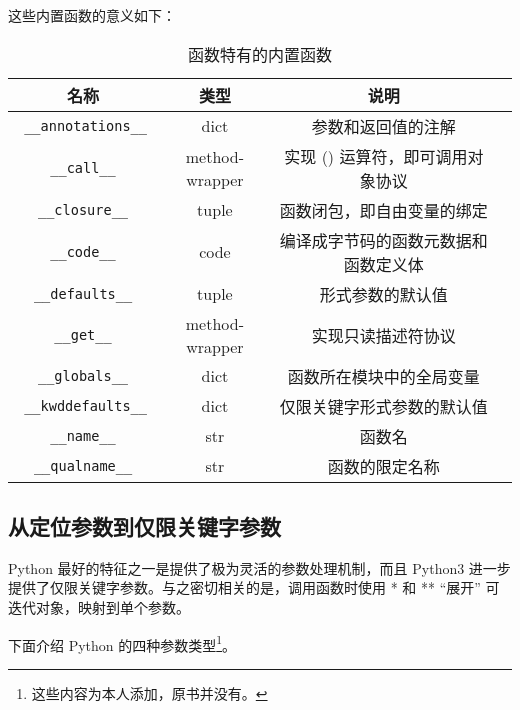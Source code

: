 

这些内置函数的意义如下：
\begin{table}[H]
    \centering
    \caption{函数特有的内置函数}
    \label{table:函数特有的内置函数}
    \setlength{\tabcolsep}{4mm}
    \begin{tabular}{c|c|cc}
        \toprule
        \textbf{名称} & \textbf{类型} & \textbf{说明} \\
        \midrule
        \texttt{ \_\_annotations\_\_ } & dict & 参数和返回值的注解 \\
        \texttt{ \_\_call\_\_ } & method-wrapper & 实现 () 运算符，即可调用对象协议 \\
        \texttt{ \_\_closure\_\_ } & tuple & 函数闭包，即自由变量的绑定 \\
        \texttt{ \_\_code\_\_ } & code & 编译成字节码的函数元数据和函数定义体 \\
        \texttt{ \_\_defaults\_\_ } & tuple & 形式参数的默认值 \\
        \texttt{ \_\_get\_\_ } & method-wrapper & 实现只读描述符协议 \\
        \texttt{ \_\_globals\_\_ } & dict & 函数所在模块中的全局变量 \\
        \texttt{ \_\_kwddefaults\_\_ } & dict & 仅限关键字形式参数的默认值 \\
        \texttt{ \_\_name\_\_ } & str & 函数名 \\
        \texttt{ \_\_qualname\_\_ } & str & 函数的限定名称 \\
        \bottomrule
    \end{tabular}
\end{table}

\subsection{从定位参数到仅限关键字参数}

Python 最好的特征之一是提供了极为灵活的参数处理机制，而且 Python3 进一步提供了仅限关键字参数。与之密切相关的是，调用函数时使用 * 和 ** ``展开'' 可迭代对象，映射到单个参数。

下面介绍 Python 的四种参数类型\footnote{这些内容为本人添加，原书并没有。}。

